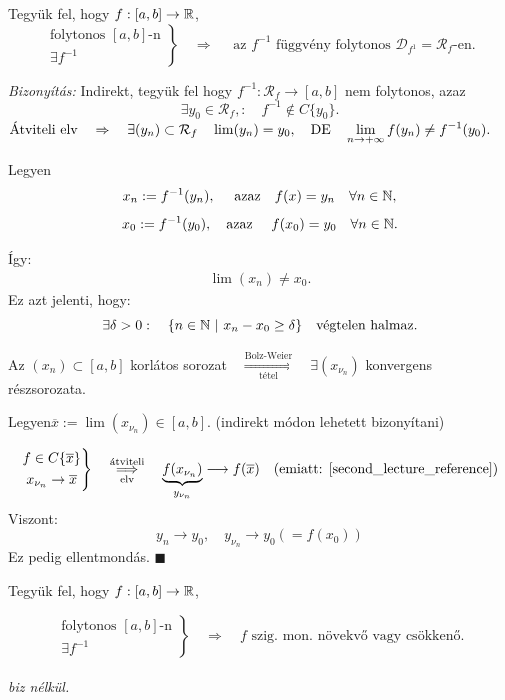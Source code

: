 \documentclass[a4paper,11.5pt]{article}
\begin{document}
	\begin{theorem}
		
		Tegyük fel, hogy $f:[a,b]\to\mathbb{R}$,
		\[\left.\begin{gathered}
		\text{folytonos } [a,b]\text{-n}\\
		\exists f^{-1}
		\end{gathered}\right\}\quad \Rightarrow\quad \text{ az }f^{-1}\text{ függvény folytonos }\mathcal{D}_{f^{1}}=\mathcal{R}_f\text{-en.}\]
		
		\textit{Bizonyítás:} Indirekt, tegyük fel hogy $f^{-1}: \mathcal{R}_f\to[a,b]$ nem folytonos, azaz
		\[ \exists y_0\in\mathcal{R}_f,:\quad f^{-1}\notin C\{y_0\}. \]
		$\text{Átviteli elv}\quad \Rightarrow\quad \exists(y_n)\subset\mathcal{R}_f\quad  \lim(y_n)=y_0,\quad \text{DE}\quad \displaystyle\lim_{n\to +\infty} f(y_n)\not= f^{-1}(y_0).$
		
		Legyen \[x_n:=f^{-1}(y_n),\quad \text{ azaz}\quad  f(x)=y_n \quad \forall n\in\mathbb{N},\]
		\[ x_0:=f^{-1}(y_0),\quad \text{azaz }\quad f(x_0)=y_0\quad \forall n\in\mathbb{N}.\]
		
		Így: \begin{gather}
			\displaystyle \lim(x_n)\not=x_0.\label{second_lecture_reference}
		\end{gather} Ez azt jelenti, hogy:
		\[ \exists\delta>0:\quad \{ n\in\N\ |\ x_n-x_0\geq \delta \}\quad \text{végtelen halmaz.} \]
		
		Az $(x_n)\subset[a,b]$ korlátos sorozat$\quad \overset{\text{Bolz-Weier}}{\underset{\text{tétel}}{\Longrightarrow}}\quad \exists (x_{\nu_n})$ konvergens részsorozata.
		
		Legyen\quad  $\overline{x}:=\lim(x_{\nu_n})\in[a,b].$ (indirekt módon lehetett bizonyítani)
		
		\[\left.\begin{gathered}
		f\in C\{\overline{x} \}\\
		x_{\nu_n}\to\overline{x}
		\end{gathered}\right\}\quad \overset{\text{átviteli}}{\underset{\text{elv}}{\Longrightarrow}}\quad \underbrace{f(x_{\nu_n})}_{y_{\nu_n}}\longrightarrow f(\overline{x}) \quad (\text{emiatt: }\ref{second_lecture_reference}) \]
		Viszont:
		\[ y_n\to y_0, \quad y_{\nu_n}\to y_0(=f(x_0)) \]
		Ez pedig ellentmondás. \quad $\blacksquare$
	\end{theorem}
	\begin{theorem}
		Tegyük fel, hogy $f:[a,b]\to\mathbb{R}$,
		
		\[\left.\begin{gathered}
		\text{folytonos }[a,b]\text{-n}\\
		\exists f^{-1}
		\end{gathered}\right\}\quad \Rightarrow\quad f\text{ szig. mon. növekvő vagy csökkenő.}\]\\
		
		\textit{biz nélkül.}
	\end{theorem}
\end{document}
